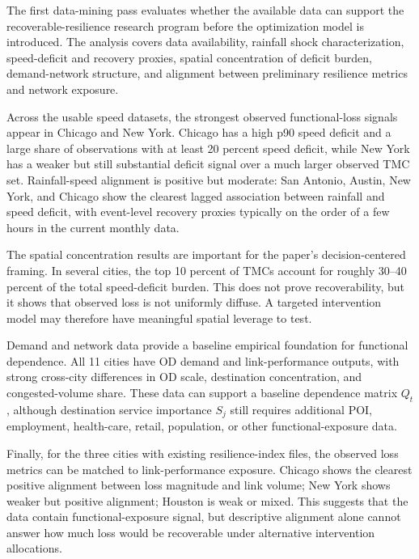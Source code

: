 The first data-mining pass evaluates whether the available data can support the recoverable-resilience research program before the optimization model is introduced. The analysis covers data availability, rainfall shock characterization, speed-deficit and recovery proxies, spatial concentration of deficit burden, demand-network structure, and alignment between preliminary resilience metrics and network exposure.

Across the usable speed datasets, the strongest observed functional-loss signals appear in Chicago and New York. Chicago has a high p90 speed deficit and a large share of observations with at least 20 percent speed deficit, while New York has a weaker but still substantial deficit signal over a much larger observed TMC set. Rainfall-speed alignment is positive but moderate: San Antonio, Austin, New York, and Chicago show the clearest lagged association between rainfall and speed deficit, with event-level recovery proxies typically on the order of a few hours in the current monthly data.

The spatial concentration results are important for the paper's decision-centered framing. In several cities, the top 10 percent of TMCs account for roughly 30--40 percent of the total speed-deficit burden. This does not prove recoverability, but it shows that observed loss is not uniformly diffuse. A targeted intervention model may therefore have meaningful spatial leverage to test.

Demand and network data provide a baseline empirical foundation for functional dependence. All 11 cities have OD demand and link-performance outputs, with strong cross-city differences in OD scale, destination concentration, and congested-volume share. These data can support a baseline dependence matrix \(Q_t\), although destination service importance \(S_j\) still requires additional POI, employment, health-care, retail, population, or other functional-exposure data.

Finally, for the three cities with existing resilience-index files, the observed loss metrics can be matched to link-performance exposure. Chicago shows the clearest positive alignment between loss magnitude and link volume; New York shows weaker but positive alignment; Houston is weak or mixed. This suggests that the data contain functional-exposure signal, but descriptive alignment alone cannot answer how much loss would be recoverable under alternative intervention allocations.
